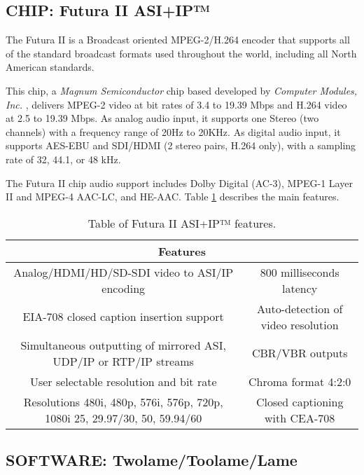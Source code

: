 \subsection{CHIP: Futura II ASI+IP™}

The Futura II \cite{futura} is a Broadcast oriented MPEG-2/H.264 encoder that supports all of the standard broadcast formats used throughout the world, including all North American standards. 

This chip, a \textit{Magnum Semiconductor} chip based developed by \textit{Computer Modules, Inc.} \cite{computermodules}, delivers MPEG-2 video at bit rates of 3.4 to 19.39 Mbps and H.264 video at 2.5 to 19.39 Mbps.
As analog audio input, it supports one Stereo (two channels) with a frequency range of 20Hz to 20KHz. As digital audio input, it supports AES-EBU and SDI/HDMI (2 stereo pairs, H.264 only), with a sampling rate of 32, 44.1, or 48 kHz.

The Futura II chip audio support includes Dolby Digital (AC-3), MPEG-1 Layer II and MPEG-4 AAC-LC, and HE-AAC.
Table \ref{tab:futura} describes the main features.

\begin{table}[h]
    \centering
    \begin{tabular}{|c|c|}
        \hline
        \multicolumn{2}{|c|}{\textbf{Features}} \\
        \hline
         Analog/HDMI/HD/SD-SDI video to ASI/IP encoding & 800 milliseconds latency \\
         \hline
          EIA-708 closed caption insertion support & Auto-detection of video resolution \\
         \hline
         Simultaneous outputting of mirrored ASI, UDP/IP or RTP/IP streams & CBR/VBR outputs \\
         \hline
         User selectable resolution and bit rate & Chroma format 4:2:0 \\
         \hline
         Resolutions 480i, 480p, 576i, 576p, 720p, 1080i 25, 29.97/30, 50, 59.94/60 & Closed captioning with CEA-708 \\
         \hline
    \end{tabular}
    \caption{Table of Futura II ASI+IP™ features.}
    \label{tab:futura}
\end{table}

\subsection{SOFTWARE: Twolame/Toolame/Lame}


